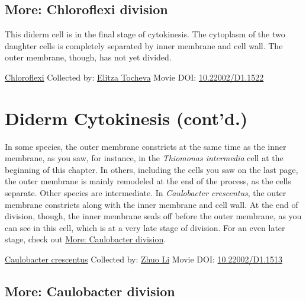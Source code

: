 \documentclass[]{tufte-book}
\begin{document}
\hypertarget{Chloroflexi_division}{%
\subsection*{More: Chloroflexi division}\label{Chloroflexi_division}}

This diderm cell is in the final stage of cytokinesis. The cytoplasm of the two daughter cells is completely separated by inner membrane and cell wall. The outer membrane, though, has not yet divided.



\hypertarget{htmlwidget-f1e88602b405084f8c1b}{}

\label{fig:5-6b}\protect\hyperlink{tree}{Chloroflexi} Collected by: \protect\hyperlink{elitza_tocheva}{Elitza Tocheva} Movie DOI: \href{https://doi.org/10.22002/D1.1522}{10.22002/D1.1522}

\hypertarget{diderm-cytokinesis-contd.}{%
\section{Diderm Cytokinesis (cont'd.)}\label{diderm-cytokinesis-contd.}}

In some species, the outer membrane constricts at the same time as the inner membrane, as you saw, for instance, in the \emph{Thiomonas intermedia} cell at the beginning of this chapter. In others, including the cells you saw on the last page, the outer membrane is mainly remodeled at the end of the process, as the cells separate. Other species are intermediate. In \emph{Caulobacter crescentus}, the outer membrane constricts along with the inner membrane and cell wall. At the end of division, though, the inner membrane seals off before the outer membrane, as you can see in this cell, which is at a very late stage of division. For an even later stage, check out \protect\hyperlink{Caulobacter_division}{More: Caulobacter division}.



\hypertarget{htmlwidget-039bf2d18f307165bdff}{}

\label{fig:5-7}\protect\hyperlink{tree}{Caulobacter crescentus} Collected by: \protect\hyperlink{zhuo_li}{Zhuo Li} Movie DOI: \href{https://doi.org/10.22002/D1.1513}{10.22002/D1.1513}

\hypertarget{Caulobacter_division}{%
\subsection*{More: Caulobacter division}\label{Caulobacter_division}}
\end{document}
